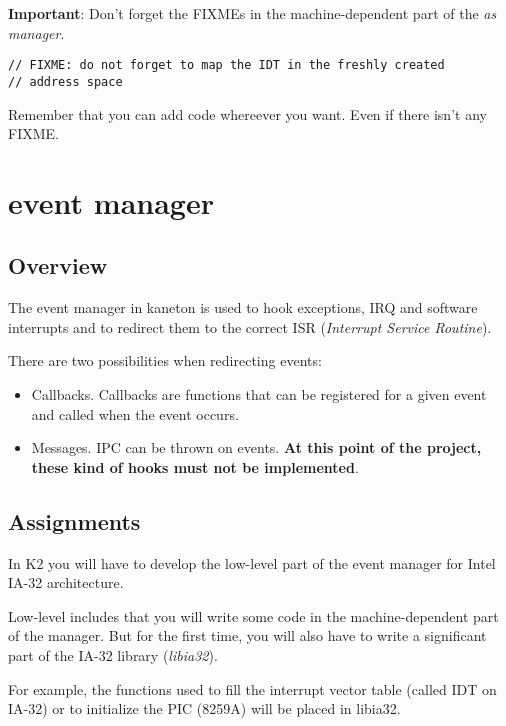 \textbf{Important}: Don't forget the FIXMEs in the machine-dependent
part of the \textit{as manager}.

\begin{verbatim}
// FIXME: do not forget to map the IDT in the freshly created
// address space
\end{verbatim}

Remember that you can add code whereever you want. Even if there isn't any FIXME.

%
%

\newpage

\section{\textbf{event} manager}

\subsection* {Overview}

The event manager in kaneton is used to hook exceptions, IRQ and
software interrupts and to redirect them to the correct ISR
(\emph{Interrupt Service Routine}).

There are two possibilities when redirecting events:
\begin{itemize}
\item
  Callbacks. Callbacks are functions that can be registered for
  a given event and called when the event occurs.
\item
  Messages. IPC can be thrown on events. \textbf{At this point
    of the project, these kind of hooks must not be implemented}.\\
\end{itemize}

\subsection* {Assignments}

In K2 you will have to develop the low-level part of the event
manager for Intel IA-32 architecture.

Low-level includes that you will write some code in the
machine-dependent part of the manager. But for the first time, you
will also have to write a significant part of the IA-32 library
(\emph{libia32}).

For example, the functions used to fill the interrupt vector table
(called IDT on IA-32) or to initialize the PIC (8259A) will be placed in
libia32.

